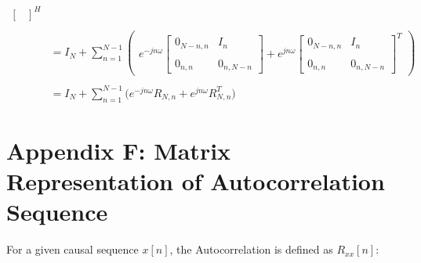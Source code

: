 \documentclass{article}
\begin{document}
\begin{align*}
\begin{bmatrix}
                                      \end{bmatrix}^{H} \\ \\
    &= I_{N} + \sum_{n = 1}^{N - 1}\begin{pmatrix}
                                        e^{-jn\omega}\begin{bmatrix}
                                                            0_{N - n, n} & I_{n} \\ \\
                                                            0_{    n, n} & 0_{n, N - n}
                                                       \end{bmatrix} +
                                        e^{ jn\omega}\begin{bmatrix}
                                                            0_{N - n, n} & I_{n} \\ \\
                                                            0_{    n, n} & 0_{n, N - n}
                                                       \end{bmatrix}^{T}
                                     \end{pmatrix} \\ \\
    &= I_{N} + \sum_{n = 1}^{N - 1}\bigg( e^{-jn\omega}R_{N, n} + e^{ jn\omega}R_{N, n}^{T} \bigg)
  \end{align*}

\newpage
\section*{Appendix F: Matrix Representation of Autocorrelation Sequence}

For a given causal sequence $x[n]$, the Autocorrelation is defined as $R_{xx}[n]$:
\end{document}
